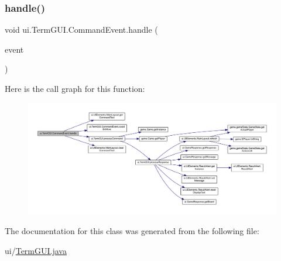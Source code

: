 \subsubsection{\texorpdfstring{handle()}{handle()}}
{\footnotesize\ttfamily void ui.\+Term\+G\+U\+I.\+Command\+Event.\+handle (\begin{DoxyParamCaption}\item[{Key\+Event}]{event }\end{DoxyParamCaption})\hspace{0.3cm}{\ttfamily [inline]}}

Here is the call graph for this function\+:
\nopagebreak
\begin{figure}[H]
\begin{center}
\leavevmode
\includegraphics[width=350pt]{classui_1_1_term_g_u_i_1_1_command_event_a318fdfbc0c417b4a990a34b275e3896e_cgraph}
\end{center}
\end{figure}


The documentation for this class was generated from the following file\+:\begin{DoxyCompactItemize}
\item 
ui/\mbox{\hyperlink{_term_g_u_i_8java}{Term\+G\+U\+I.\+java}}\end{DoxyCompactItemize}
